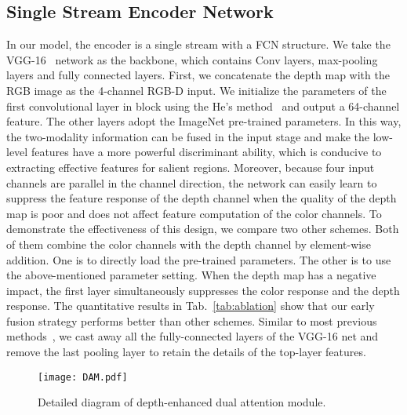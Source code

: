 \documentclass[runningheads]{llncs}
\begin{document}
\subsection{Single Stream Encoder Network}\label{sec:Encoder_Network}
In our model, the encoder is a single stream with a FCN structure. We take the VGG-16~\cite{VGG} network as the backbone, which contains  Conv layers,  max-pooling layers and  fully connected layers. First, we concatenate the depth map with the RGB image as the 4-channel RGB-D input. 
We initialize the parameters of the first convolutional layer in block  using the He's method~\cite{PRelu} and output a 64-channel feature. The other layers adopt the ImageNet pre-trained parameters. In this way, the two-modality information can be fused in the input stage and make the low-level features have a more powerful discriminant ability, which is conducive to extracting effective features for salient regions. 
Moreover, because four input channels are parallel in the channel direction, the network can easily learn to suppress the feature response of the depth channel when the quality of the depth map is poor and does not affect feature computation of the color channels. To demonstrate the effectiveness of this design, we compare two other schemes. Both of them combine the color channels with the depth channel by element-wise addition. One is to directly load the pre-trained parameters. The other is to use the above-mentioned parameter setting. When the depth map has a negative impact, the first layer simultaneously suppresses the color response and the depth response. The quantitative results in Tab.~\ref{tab:ablation} show that our early fusion strategy performs better than other schemes.  
Similar to most previous methods~\cite{PDNet,PCA,CPFP,TANet,AF_RGBD,DMRA}, we cast away all the fully-connected layers of the VGG-16 net and remove the last pooling layer to retain the details of the top-layer features.


\begin{figure}[t]
\centering
\texttt{[image: DAM.pdf]}\\
\caption{Detailed diagram of depth-enhanced dual attention module.}
\label{fig:DAM}
\end{figure}
\end{document}
